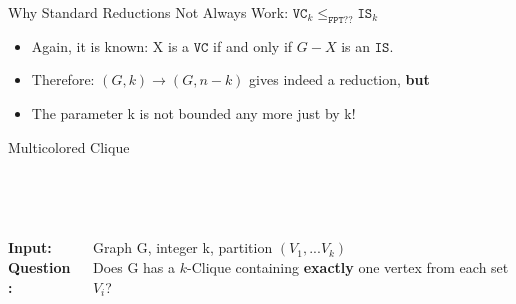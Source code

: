 \begin{frame}[c]{Why Standard Reductions Not Always Work:  $\mathtt{VC}_k \leq_{\mathtt{FPT??}} \mathtt{IS}_k$}
\begin{center}

\begin{itemize}
    \pause\item Again, it is known: X is a $\mathtt{VC}$ if and only if $G - X $ is an $\mathtt{IS}$.
    \pause\item Therefore: $(G, k) \longrightarrow (G, n - k)$ gives indeed a reduction,  \textbf{but} %
    \pause\item The parameter k is not bounded any more just by k!
\end{itemize}
\end{center}
\end{frame}



\begin{frame}[c]{Multicolored Clique}
\begin{center}
\begin{tcolorbox}[colback=green!5,colframe=green!40!black,title=\textrm{MULTICOLORED~CLIQUE~(PARTITIONED~CLIQUE) \cite[p. 428]{Cygan2015}}]
\begin{columns}[T] %
    \begin{column}{.18\textwidth}
    \\~
    
    \textbf{Input:}\\
    \textbf{Question:}
    \end{column}
    \begin{column}{.78\textwidth}
    \\~
    
    Graph G, integer k, partition $(V_1, ...V_k)$\\
    Does G has a $k$-Clique containing \textbf{exactly} one vertex from each set $V_i$?
    \end{column}
 \end{columns}
\end{tcolorbox}
\end{center}
\end{frame}


